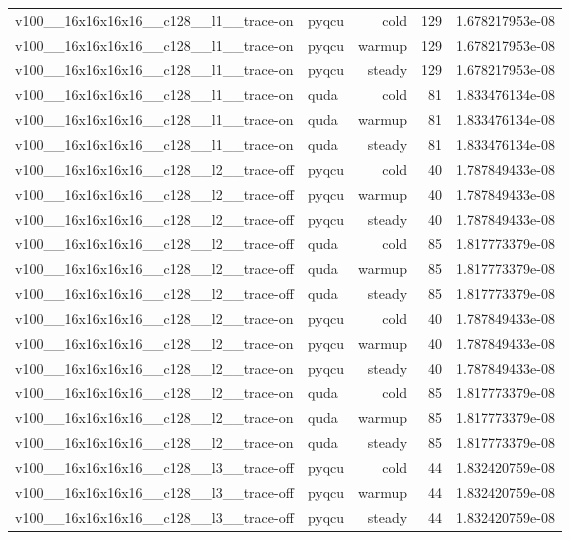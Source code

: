 \begin{table}[htbp]
\begin{tabular}{@{}llrrr@{}}
v100\_\_16x16x16x16\_\_c128\_\_l1\_\_trace-on & pyqcu & cold & 129 & 1.678217953e-08 \\
v100\_\_16x16x16x16\_\_c128\_\_l1\_\_trace-on & pyqcu & warmup & 129 & 1.678217953e-08 \\
v100\_\_16x16x16x16\_\_c128\_\_l1\_\_trace-on & pyqcu & steady & 129 & 1.678217953e-08 \\
v100\_\_16x16x16x16\_\_c128\_\_l1\_\_trace-on & quda & cold & 81 & 1.833476134e-08 \\
v100\_\_16x16x16x16\_\_c128\_\_l1\_\_trace-on & quda & warmup & 81 & 1.833476134e-08 \\
v100\_\_16x16x16x16\_\_c128\_\_l1\_\_trace-on & quda & steady & 81 & 1.833476134e-08 \\
v100\_\_16x16x16x16\_\_c128\_\_l2\_\_trace-off & pyqcu & cold & 40 & 1.787849433e-08 \\
v100\_\_16x16x16x16\_\_c128\_\_l2\_\_trace-off & pyqcu & warmup & 40 & 1.787849433e-08 \\
v100\_\_16x16x16x16\_\_c128\_\_l2\_\_trace-off & pyqcu & steady & 40 & 1.787849433e-08 \\
v100\_\_16x16x16x16\_\_c128\_\_l2\_\_trace-off & quda & cold & 85 & 1.817773379e-08 \\
v100\_\_16x16x16x16\_\_c128\_\_l2\_\_trace-off & quda & warmup & 85 & 1.817773379e-08 \\
v100\_\_16x16x16x16\_\_c128\_\_l2\_\_trace-off & quda & steady & 85 & 1.817773379e-08 \\
v100\_\_16x16x16x16\_\_c128\_\_l2\_\_trace-on & pyqcu & cold & 40 & 1.787849433e-08 \\
v100\_\_16x16x16x16\_\_c128\_\_l2\_\_trace-on & pyqcu & warmup & 40 & 1.787849433e-08 \\
v100\_\_16x16x16x16\_\_c128\_\_l2\_\_trace-on & pyqcu & steady & 40 & 1.787849433e-08 \\
v100\_\_16x16x16x16\_\_c128\_\_l2\_\_trace-on & quda & cold & 85 & 1.817773379e-08 \\
v100\_\_16x16x16x16\_\_c128\_\_l2\_\_trace-on & quda & warmup & 85 & 1.817773379e-08 \\
v100\_\_16x16x16x16\_\_c128\_\_l2\_\_trace-on & quda & steady & 85 & 1.817773379e-08 \\
v100\_\_16x16x16x16\_\_c128\_\_l3\_\_trace-off & pyqcu & cold & 44 & 1.832420759e-08 \\
v100\_\_16x16x16x16\_\_c128\_\_l3\_\_trace-off & pyqcu & warmup & 44 & 1.832420759e-08 \\
v100\_\_16x16x16x16\_\_c128\_\_l3\_\_trace-off & pyqcu & steady & 44 & 1.832420759e-08 \\

\end{tabular}
\end{table}
